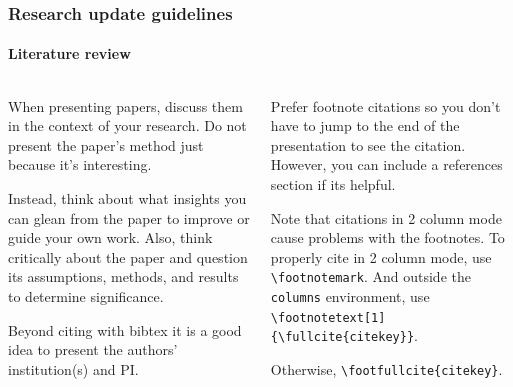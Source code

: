 \documentclass[aspectratio=1610]{beamer}
\begin{document}
\begin{frame}[fragile]
  \frametitle{Research update guidelines}
  \framesubtitle{Literature review}
  \begin{columns}
    \begin{column}{0.5\textwidth}
      \begin{small}
        \hspace{-.75em} When presenting papers, discuss them in the context of your research. Do
        not present the paper's method just because it's interesting.

        \vspace{0.5cm} Instead, think about what insights you can glean from the paper to improve
        or guide your own work. Also, think critically about the paper and
        question its assumptions, methods, and results to determine significance.

        \vspace{0.5cm}
        Beyond citing with bibtex it is a good idea to present the authors'
        institution(s) and PI.
      \end{small}
    \end{column}
    \begin{column}{0.5\textwidth}
      \begin{itemize}
        \begin{scriptsize}
        \item Prefer footnote citations so you don't have to
          jump to the end of the presentation to see the citation. However, you
          can include a references section if its helpful.
        \item Note that citations in 2 column mode cause problems with the
          footnotes. To properly cite in 2 column mode, use
          \verb$\footnotemark$. And outside the \texttt{columns} environment,
          use \verb$\footnotetext[1]{\fullcite{citekey}}$.\footnotemark
        \item Otherwise, \verb$\footfullcite{citekey}$.
        \end{scriptsize}
      \end{itemize}
    \end{column}
  \end{columns}
\end{frame}
\end{document}

